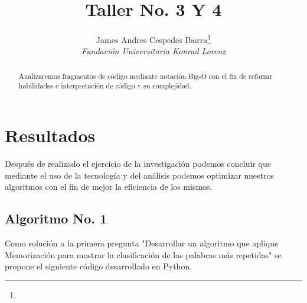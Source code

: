\documentclass[journal, spanish]{IEEEtran}
\title{Taller No. 3 Y 4}
\author{James Andres Cespedes Ibarra\thanks{} \\
\textit{Fundación Universitaria Konrad Lorenz} \\
}
\begin{document}
\maketitle

\begin{abstract}

Analizaremos fragmentos de código mediante notación Big-O con el fin de reforzar habilidades e interpretación de código y su complejidad.

\end{abstract}

\section{Resultados}

Después de realizado el ejercicio de la investigación podemos concluir que mediante el uso de la tecnología y del análisis podemos optimizar nuestros algoritmos con el fin de mejor la eficiencia de los mismos.

\subsection{Algoritmo No. 1}

Como solución a la primera pregunta "Desarrollar un algoritmo que aplique Memorización para mostrar la clasificación de las palabras más repetidas" se propone el siguiente código desarrollado en Python.
\end{document}
